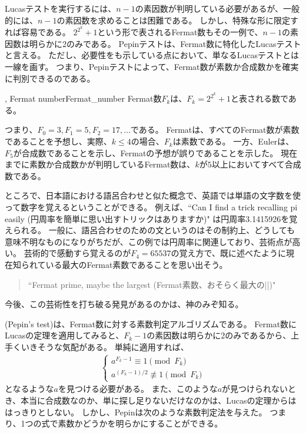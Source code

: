 Lucasテストを実行するには、$n-1$の素因数が判明している必要があるが、一般的には、$n-1$の素因数を求めることは困難である。
しかし、特殊な形に限定すれば容易である。
$2^{2^k} + 1$という形で表されるFermat数もその一例で、$n-1$の素因数は明らかに2のみである。
Pepinテストは、Fermat数に特化したLucasテストと言える。
ただし、必要性をも示している点において、単なるLucasテストとは一線を画す。
つまり、Pepinテストによって、Fermat数が素数か合成数かを確実に判別できるのである。

\begin{Defi}{, Fermat number}{Fermat_number}
Fermat数$F_k$は、$F_k=2^{2^k} + 1$と表される数である。
\end{Defi}

つまり、$F_0=3, F_1 = 5, F_2 = 17,\ldots$である。
Fermatは、すべてのFermat数が素数であることを予想し、実際、$k \le 4$の場合、$F_k$は素数である。
一方、Eulerは、$F_5$が合成数であることを示し、Fermatの予想が誤りであることを示した。
現在までに素数か合成数かが判明しているFermat数は、$k$が$5$以上においてすべて合成数である。

ところで、日本語における語呂合わせと似た概念で、英語では単語の文字数を使って数字を覚えるということができる。
例えば、``Can I find a trick recalling pi easily (円周率を簡単に思い出すトリックはありますか)" は円周率3.1415926を覚えられる。
一般に、語呂合わせのための文というのはその制約上、どうしても意味不明なものになりがちだが、この例では円周率に関連しており、芸術点が高い。
芸術的で感動すら覚えるのが$F_4=65537$の覚え方で、既に述べたように現在知られている最大のFermat素数であることを思い出そう。
\begin{quotation}
``Fermat prime, maybe the largest (Fermat素数、おそらく最大の||)" 
\end{quotation}
今後、この芸術性を打ち破る発見があるのかは、神のみぞ知る。

(Pepin's test)は、Fermat数に対する素数判定アルゴリズムである。
Fermat数にLucasの定理を適用してみると、$F_k - 1$の素因数は明らかに2のみであるから、上手くいきそうな気配がある。
単純に適用すれば、
\begin{align*}
\begin{cases}
a^{F_k-1} \equiv 1 \pmod{F_k}\\
a^{(F_k-1)/2} \not\equiv 1 \pmod{F_k}
\end{cases}
\end{align*}
となるような$a$を見つける必要がある。
また、このような$a$が見つけられないとき、本当に合成数なのか、単に探し足りないだけなのかは、Lucasの定理からははっきりとしない。
しかし、Pepinは次のような素数判定法を与えた。
つまり、1つの式で素数かどうかを明らかにすることができる。

